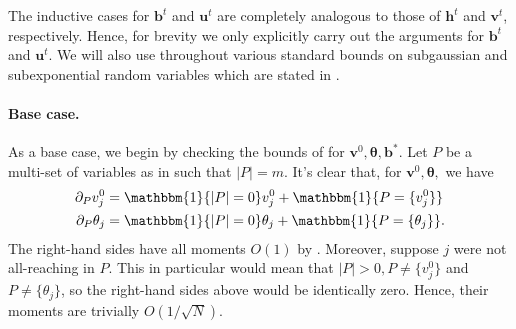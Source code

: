 \documentclass{article}
\newcommand{\1}{\mathbbm{1}}
\theoremstyle{plain}
\theoremstyle{definition}
\theoremstyle{remark}
\newcommand{\bfu}{\boldsymbol{u}}
\newcommand{\bfv}{\boldsymbol{v}}
\newcommand{\bfh}{\boldsymbol{h}}
\newcommand{\bfb}{\boldsymbol{b}}
\newcommand{\bftheta}{\boldsymbol{\theta}}
\begin{document}
The inductive cases for $\bfb^t$ and $\bfu^t$ are completely analogous to those of $\bfh^t$ and $\bfv^t$, respectively. Hence, for brevity we only explicitly carry out the arguments for $\bfb^t$ and $\bfu^t$. We will also use throughout various standard bounds on subgaussian and subexponential random variables which are stated in .

\paragraph{Base case.} As a base case, we begin by checking the bounds of  for $\bfv^0,\bftheta,\bfb^*.$ Let $P$ be a multi-set of variables as in  such that $|P|=m.$ It's clear that, for $\bfv^0,\bftheta,$ we have
\begin{align*}
    \partial_{P}v^0_j &= \1\{|P|=0\}v^0_j + \1\{P = \{v^0_j\}\} \\
    \partial_{P}\theta_j &= \1\{|P|=0\}\theta_j + \1\{P = \{\theta_j\}\}.
\end{align*}
The right-hand sides have all moments $O(1)$ by . Moreover, suppose $j$ were not all-reaching in $P$. This in particular would mean that $|P|>0, P \neq \{v^0_j\}$ and $P \neq \{\theta_j\}$, so the right-hand sides above would be identically zero. Hence, their moments are trivially $O(1/\sqrt{N}).$
\end{document}
